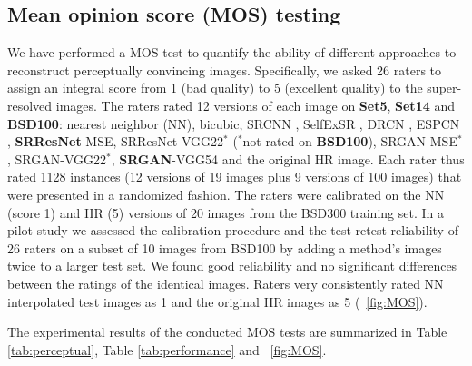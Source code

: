 \documentclass[10pt,twocolumn,letterpaper]{article}
\begin{document}
\subsection{Mean opinion score (MOS) testing}
We have performed a \ac{MOS} test to quantify the ability of different approaches to reconstruct perceptually convincing images. Specifically, we asked 26 raters to assign an integral score from 1 (bad quality) to 5 (excellent quality) to the super-resolved images. The raters rated 12 versions of each image on \textbf{Set5}, \textbf{Set14} and \textbf{BSD100}: nearest neighbor (NN), bicubic, SRCNN \cite{dong2014learning}, SelfExSR \cite{Huang15selfexemplars}, DRCN \cite{kim2016deeply}, ESPCN \cite{Shi2016ESPCN}, \textbf{SRResNet}-MSE, SRResNet-VGG22$^\ast$ ($^\ast$not rated on \textbf{BSD100}), SRGAN-MSE$^\ast$, SRGAN-VGG22$^\ast$, \textbf{SRGAN}-VGG54 and the original HR image. Each rater thus rated 1128 instances (12 versions of 19 images plus 9 versions of 100 images) that were presented in a randomized fashion.
The raters were calibrated on the NN (score 1) and HR (5) versions of 20 images from the BSD300 training set.
In a pilot study we assessed the calibration procedure and the test-retest reliability of 26 raters on a subset of 10 images from BSD100 by adding a method's images twice to a larger test set. We found good reliability and no significant differences between the ratings of the identical images.
Raters very consistently rated NN interpolated test images as 1 and the original HR images as 5 (\cf \figurename~\ref{fig:MOS}).

The experimental results of the conducted \ac{MOS} tests are summarized in Table \ref{tab:perceptual}, Table \ref{tab:performance} and \figurename~\ref{fig:MOS}.
\end{document}
